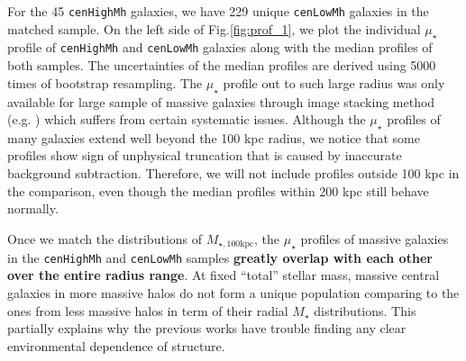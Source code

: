 \documentclass{emulateapj}
\def\rbcg{\texttt{cenHighMh}}
\def\nbcg{\texttt{cenLowMh}}
\def\mstar{{$M_{\star}$}}
\def\mtot{{$M_{\star,100\mathrm{kpc}}$}}
\def\mden{{$\mu_{\star}$}}
\newcommand{\update}[1]{\textcolor{Bittersweet}{#1}}
\begin{document}
\begin{CJK*}{UTF8}{gbsn}
    For the 45 \rbcg{} galaxies, we have 229 unique \nbcg{} galaxies in the 
    matched sample.
    \update{
    On the left side of Fig.\ref{fig:prof_1}, we plot the individual \mden{} profile 
    of \rbcg{} and \nbcg{} galaxies along with the median profiles of both samples.
    The uncertainties of the median profiles are derived using 5000 times of 
    bootstrap resampling.
    The \mden{} profile out to such large radius was only available for large sample of 
    massive galaxies through image stacking method (e.g. \citep{Tal2011, DSouza2015}) 
    which suffers from certain systematic issues.}
    Although the \mden{} profiles of many galaxies extend well beyond the 100 kpc radius, 
    we notice that some profiles show sign of unphysical truncation that is caused 
    by inaccurate background subtraction.  
    Therefore, we will not include profiles outside 100 kpc in the comparison, even 
    though the median profiles within 200 kpc still behave normally.  
        
    Once we match the distributions of \mtot{}, the \mden{} profiles of massive 
    galaxies in the \rbcg{} and \nbcg{} samples \textbf{greatly overlap with each 
    other over the entire radius range}. 
    At fixed ``total'' stellar mass, massive central galaxies in more massive 
    halos do not form a unique population comparing to the ones from less massive 
    halos in term of their radial \mstar{} distributions. 
    \update{
    This partially explains why the previous works have trouble finding any clear 
    environmental dependence of structure.} 
    

\end{CJK*}
\end{document}
